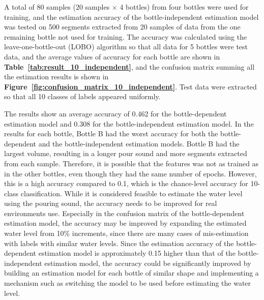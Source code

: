 \documentclass[sigconf]{acmart}
\newcommand\figref[1]{\textbf{Figure~\ref{fig:#1}}}
\newcommand\tabref[1]{\textbf{Table~\ref{tab:#1}}}
\begin{document}
A total of 80 samples (20 samples $\times$ 4 bottles) from four bottles were used for training, and the estimation accuracy of the bottle-independent estimation model was tested on 500 segments extracted from 20 samples of data from the one remaining bottle not used for training. The accuracy was calculated using the leave-one-bottle-out (LOBO) algorithm so that all data for 5 bottles were test data, and the average values of accuracy for each bottle are shown in \tabref{result_10_independent}, and the confusion matrix summing all the estimation results is shown in \figref{confusion_matrix_10_independent}. Test data were extracted so that all 10 classes of labels appeared uniformly.\par

The results show an average accuracy of 0.462 for the bottle-dependent estimation model and 0.308 for the bottle-independent estimation model. In the results for each bottle, Bottle B had the worst accuracy for both the bottle-dependent and the bottle-independent estimation models. Bottle B had the largest volume, resulting in a longer pour sound and more segments extracted from each sample. Therefore, it is possible that the features was not as trained as in the other bottles, even though they had the same number of epochs. However, this is a high accuracy compared to 0.1, which is the chance-level accuracy for 10-class classification. While it is considered feasible to estimate the water level using the pouring sound, the accuracy needs to be improved for real environments use. Especially in the confusion matrix of the bottle-dependent estimation model, the accuracy may be improved by expanding the estimated water level from 10\% increments, since there are many cases of mis-estimation with labels with similar water levels. Since the estimation accuracy of the bottle-dependent estimation model is approximately 0.15 higher than that of the bottle-independent estimation model, the accuracy could be significantly improved by building an estimation model for each bottle of similar shape and implementing a mechanism such as switching the model to be used before estimating the water level.
\end{document}

